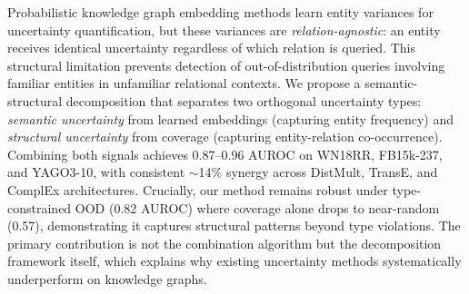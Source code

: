 
Probabilistic knowledge graph embedding methods learn entity variances for uncertainty quantification, but these variances are \emph{relation-agnostic}: an entity receives identical uncertainty regardless of which relation is queried.
This structural limitation prevents detection of out-of-distribution queries involving familiar entities in unfamiliar relational contexts.
We propose a semantic-structural decomposition that separates two orthogonal uncertainty types: \emph{semantic uncertainty} from learned embeddings (capturing entity frequency) and \emph{structural uncertainty} from coverage (capturing entity-relation co-occurrence).
Combining both signals achieves 0.87--0.96 AUROC on WN18RR, FB15k-237, and YAGO3-10, with consistent $\sim$14\% synergy across DistMult, TransE, and ComplEx architectures.
Crucially, our method remains robust under type-constrained OOD (0.82 AUROC) where coverage alone drops to near-random (0.57), demonstrating it captures structural patterns beyond type violations.
The primary contribution is not the combination algorithm but the decomposition framework itself, which explains why existing uncertainty methods systematically underperform on knowledge graphs.
